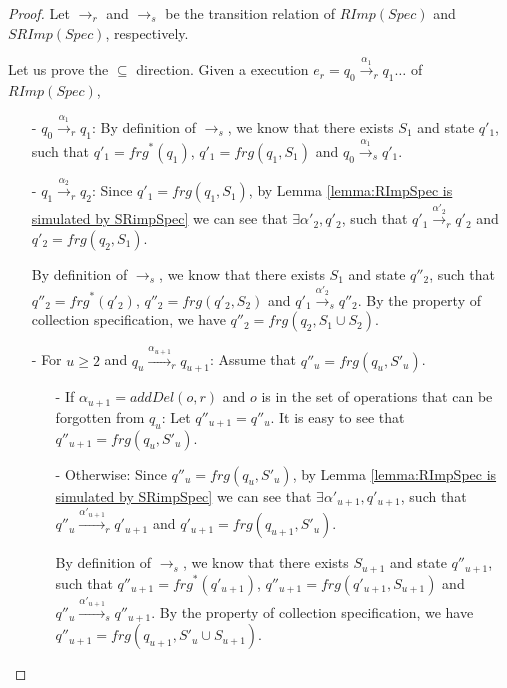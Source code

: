 \begin {proof}

Let $\rightarrow_r$ and $\rightarrow_s$ be the transition relation of $\mathit{RImp}(\mathit{Spec})$ and $\mathit{SRImp}(\mathit{Spec})$, respectively.

Let us prove the $\subseteq$ direction. Given a execution $e_r = q_0 {\xrightarrow{\alpha_1}}_r q_1 \ldots$ of $\mathit{RImp}(\mathit{Spec})$,

\begin{itemize}
\setlength{\itemsep}{0.5pt}
\item[-] $q_0 {\xrightarrow{\alpha_1}}_r q_1$: By definition of $\rightarrow_s$, we know that there exists $S_1$ and state $q'_1$, such that $q'_1 = \mathit{frg}^*(q_1)$, $q'_1 = \mathit{frg}(q_1,S_1)$ and $q_0 {\xrightarrow{\alpha_1}}_s q'_1$.

\item[-] $q_1 {\xrightarrow{\alpha_2}}_r q_2$: Since $q'_1 = \mathit{frg}(q_1,S_1)$, by Lemma \ref{lemma:RImpSpec is simulated by SRimpSpec} we can see that $\exists \alpha'_2, q'_2$, such that $q'_1 {\xrightarrow{\alpha'_2}}_r q'_2$ and $q'_2 = \mathit{frg}(q_2,S_1)$.

By definition of $\rightarrow_s$, we know that there exists $S_1$ and state $q''_2$, such that $q''_2 = \mathit{frg}^*(q'_2)$, $q''_2 = \mathit{frg}(q'_2,S_2)$ and $q'_1 {\xrightarrow{\alpha'_2}}_s q''_2$. By the property of collection specification, we have $q''_2 = \mathit{frg}(q_2,S_1 \cup S_2)$.

\item[-] For $u \geq 2$ and $q_u {\xrightarrow{\alpha_{u+1}}}_r q_{u+1}$: Assume that $q''_u = \mathit{frg}(q_u,S'_u)$.

    \begin{itemize}
    \setlength{\itemsep}{0.5pt}
    \item[-] If $\alpha_{u+1} = \mathit{addDel}(o,r)$ and $o$ is in the set of operations that can be forgotten from $q_u$: Let $q''_{u+1} = q''_u$. It is easy to see that $q''_{u+1} = \mathit{frg}(q_u,S'_u)$.

    \item[-] Otherwise: Since $q''_u = \mathit{frg}(q_u,S'_u)$, by Lemma \ref{lemma:RImpSpec is simulated by SRimpSpec} we can see that $\exists \alpha'_{u+1}, q'_{u+1}$, such that $q''_u {\xrightarrow{\alpha'_{u+1}}}_r q'_{u+1}$ and $q'_{u+1} = \mathit{frg}(q_{u+1},S'_u)$.

    By definition of $\rightarrow_s$, we know that there exists $S_{u+1}$ and state $q''_{u+1}$, such that $q''_{u+1} = \mathit{frg}^*(q'_{u+1})$, $q''_{u+1} = \mathit{frg}(q'_{u+1},S_{u+1})$ and $q''_u {\xrightarrow{\alpha'_{u+1}}}_s q''_{u+1}$. By the property of collection specification, we have $q''_{u+1} = \mathit{frg}(q_{u+1},S'_u \cup S_{u+1})$.
    \end{itemize}
\end{itemize}


\end{proof}
